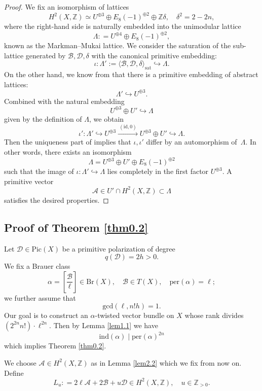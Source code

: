 \documentclass[11pt]{amsart}
\theoremstyle{plain}
\theoremstyle{definition}
\theoremstyle{remark}
\newcommand{\BZ}{{\mathbb{Z}}}
\newcommand{\CA}{{\mathcal A}}
\newcommand{\CB}{{\mathcal B}}
\newcommand{\CD}{{\mathcal D}}
\begin{document}
 \begin{proof}
We fix an isomorphism of lattices
\[
H^2(X, \BZ) \simeq U^{\oplus 3} \oplus E_8(-1)^{\oplus 2} \oplus \BZ\delta, \quad \delta^2 = 2-2n,
\]
where the right-hand side is naturally embedded into the unimodular lattice 
\[
 \Lambda: = U^{\oplus 4} \oplus E_8(-1)^{\oplus 2},
\]
known as the Markman--Mukai lattice. We consider the saturation of the sub-lattice generated by $\CB, \CD, \delta$ with the canonical primitive embedding:
\[
\iota: \Lambda':= \langle \CB, \CD, \delta \rangle_{\mathrm{sat}} \hookrightarrow \Lambda. 
\]
On the other hand, we know from \cite[Proposition 1.8]{HK3} that there is a primitive embedding of abstract lattices:
\[
\Lambda' \hookrightarrow U^{\oplus 3}.
\]
Combined with the natural embedding 
\[
U^{\oplus 3} \oplus U' \hookrightarrow \Lambda
\]
given by the definition of $\Lambda$, we obtain 
\[
\iota': \Lambda' \hookrightarrow U^{\oplus 3} \xrightarrow{~(\mathrm{id},0)~} U^{\oplus 3} \oplus U' \hookrightarrow \Lambda.
\]
Then the uniqueness part of \cite[Corollary 1.9]{HK3} implies that $\iota,\iota'$ differ by an automorphism of~$\Lambda$. In other words, there exists an isomorphism
\[
\Lambda = U^{\oplus 3} \oplus U' \oplus E_8(-1)^{\oplus 2}
\]
such that the image of $\iota: \Lambda' \hookrightarrow \Lambda$ lies completely in the first factor $U^{\oplus 3}$. A primitive vector  
\[
\CA \in U' \cap H^2(X, \BZ) \subset \Lambda
\]
satisfies the desired properties.
\end{proof}

 

\subsection{Proof of Theorem \ref{thm0.2}}
Let $\CD \in \mathrm{Pic}(X)$ be a primitive polarization of degree
\[
q(\CD) = 2h >0.
\]
We fix a Brauer class
\[
\alpha = \left[\frac{\CB}{\ell}\right] \in \mathrm{Br}(X), \quad \CB \in T(X), \quad \mathrm{per}(\alpha) = \ell;
\]
we further assume that
\begin{equation}\label{assumption0}
\mathrm{gcd}(\ell, n!h) = 1.
\end{equation}
Our goal is to construct an $\alpha$-twisted vector bundle on $X$ whose rank divides $\left(2^{2n}n!\right)\cdot \ell^{2n}$. Then by Lemma \ref{lem1.1} we have
\[
\mathrm{ind}(\alpha ) \mid \mathrm{per}(\alpha)^{2n}
\]
which implies Theorem \ref{thm0.2}.


We choose $\CA \in H^2(X, \BZ)$ as in Lemma \ref{lem2.2} which we fix from now on. Define
\[
L_u: = 2\ell  \CA + 2\CB + u\CD \in H^2(X, \BZ), \quad  u \in \BZ_{>0}. 
\]
\end{document}
